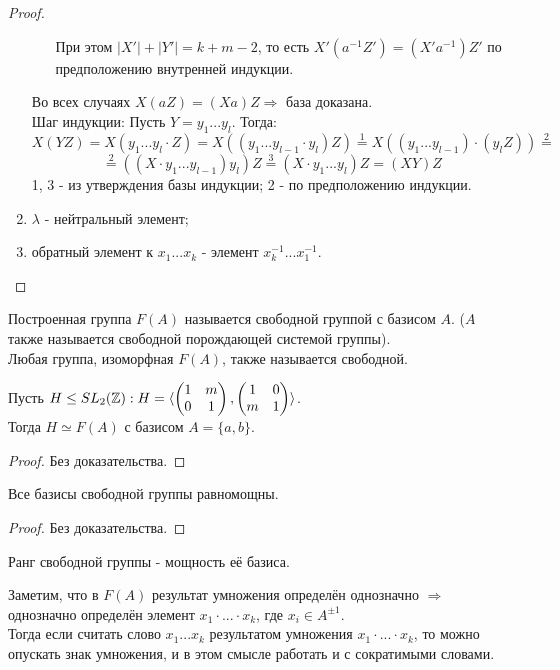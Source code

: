 \begin{proof}
\begin{enumerate}
\begin{itemize}
            При этом $|X'| + |Y'| = k + m - 2$, то есть $X'(a^{-1}Z') = (X'a^{-1})Z'$ по предположению внутренней индукции.
        \end{itemize}
        Во всех случаях $X(aZ) = (Xa)Z \Longrightarrow$ база доказана.\\
        Шаг индукции: Пусть $Y = y_1...y_l$. Тогда:
        \[X(YZ) = X(y_1...y_l\cdot Z) = X((y_1...y_{l-1}\cdot y_l)Z) \overset{1}{=} X((y_1...y_{l-1})\cdot (y_lZ)) \overset{2}{=}\] 
        \[\overset{2}{=} ((X\cdot y_1...y_{l-1}) y_l)Z \overset{3}{=} (X\cdot y_1...y_l)Z = (XY)Z\]
        1, 3 - из утверждения базы индукции; 2 - по предположению индукции.
        \item $\lambda$ - нейтральный элемент;
        \item обратный элемент к $x_1...x_k$ - элемент $x_k^{-1}...x_1^{-1}$.
    \end{enumerate}
\end{proof}
\begin{definition}
    Построенная группа $F(A)$ называется свободной группой с базисом $A$. ($A$ также называется свободной порождающей системой группы).\\
    Любая группа, изоморфная $F(A)$, также называется свободной.
\end{definition}
\begin{subtheorem}
    Пусть $H \leq SL_2(\mathbb{Z}): H = \langle \begin{pmatrix} 1&m\\0&1\end{pmatrix}, \begin{pmatrix} 1&0\\m&1\end{pmatrix} \rangle$.\\
    Тогда $H \simeq F(A)$ с базисом $A = \{a, b\}$.
\end{subtheorem}
\begin{proof}
    Без доказательства.
\end{proof}
\begin{subtheorem}
    Все базисы свободной группы равномощны.
\end{subtheorem}
\begin{proof}
    Без доказательства.
\end{proof}
\begin{definition}
    Ранг свободной группы - мощность её базиса.
\end{definition}
\begin{remark}
    Заметим, что в $F(A)$ результат умножения определён однозначно $\Longrightarrow$ однозначно определён элемент $x_1\cdot ... \cdot x_k$, где $x_i \in A^{\pm 1}$.\\
    Тогда если считать слово $x_1...x_k$ результатом умножения $x_1\cdot ... \cdot x_k$, то можно опускать знак умножения, и в этом смысле работать и с сократимыми словами. 
\end{remark}
